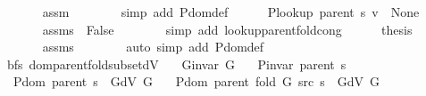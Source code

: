 \begin{isabellebody}
\ \ \ \ \ \ \isamarkupfalse%
\ assm\isanewline
\ \ \ \ \ \ \isamarkupfalse%
\ {\isacharparenleft}{\kern0pt}simp\ add{\isacharcolon}{\kern0pt}\ P{\isachardot}{\kern0pt}dom{\isacharunderscore}{\kern0pt}def{\isacharparenright}{\kern0pt}\isanewline
\ \ \ \ \isamarkupfalse%
\ {\isachardoublequoteopen}P{\isacharunderscore}{\kern0pt}lookup\ {\isacharparenleft}{\kern0pt}parent\ s{\isacharparenright}{\kern0pt}\ v\ {\isasymnoteq}\ None{\isachardoublequoteclose}\isanewline
\ \ \ \ \ \ \isamarkupfalse%
\ assms{\isacharparenleft}{\kern0pt}{}{\isacharcomma}{\kern0pt}\ {}{\isacharparenright}{\kern0pt}\ False\isanewline
\ \ \ \ \ \ \isamarkupfalse%
\ {\isacharparenleft}{\kern0pt}simp\ add{\isacharcolon}{\kern0pt}\ lookup{\isacharunderscore}{\kern0pt}parent{\isacharunderscore}{\kern0pt}fold{\isacharunderscore}{\kern0pt}cong{\isacharparenright}{\kern0pt}\isanewline
\ \ \ \ \isamarkupfalse%
\ {\isacharquery}{\kern0pt}thesis\isanewline
\ \ \ \ \ \ \isamarkupfalse%
\ assms{\isacharparenleft}{\kern0pt}{}{\isacharparenright}{\kern0pt}\isanewline
\ \ \ \ \ \ \isamarkupfalse%
\ {\isacharparenleft}{\kern0pt}auto\ simp\ add{\isacharcolon}{\kern0pt}\ P{\isachardot}{\kern0pt}dom{\isacharunderscore}{\kern0pt}def{\isacharparenright}{\kern0pt}\isanewline
\ \ \isamarkupfalse%
\isanewline
{}\isamarkupfalse%
%
\endisatagproof
{\isafoldproof}%
%
\isadelimproof
\isanewline
%
\endisadelimproof
%
\isadeliminvisible
\isanewline
%
\endisadeliminvisible
%
\isataginvisible
{}\isamarkupfalse%
\ {\isacharparenleft}{\kern0pt}\ bfs{\isacharparenright}{\kern0pt}\ dom{\isacharunderscore}{\kern0pt}parent{\isacharunderscore}{\kern0pt}fold{\isacharunderscore}{\kern0pt}subset{\isacharunderscore}{\kern0pt}dV{\isacharunderscore}{\kern0pt}{}{\isacharcolon}{\kern0pt}\isanewline
\ \ \ {\isachardoublequoteopen}G{\isachardot}{\kern0pt}invar\ G{\isachardoublequoteclose}\isanewline
\ \ \ {\isachardoublequoteopen}P{\isacharunderscore}{\kern0pt}invar\ {\isacharparenleft}{\kern0pt}parent\ s{\isacharparenright}{\kern0pt}{\isachardoublequoteclose}\isanewline
\ \ \ {\isachardoublequoteopen}P{\isachardot}{\kern0pt}dom\ {\isacharparenleft}{\kern0pt}parent\ s{\isacharparenright}{\kern0pt}\ {\isasymsubseteq}\ G{\isachardot}{\kern0pt}dV\ G{\isachardoublequoteclose}\isanewline
\ \ \ {\isachardoublequoteopen}P{\isachardot}{\kern0pt}dom\ {\isacharparenleft}{\kern0pt}parent\ {\isacharparenleft}{\kern0pt}fold\ G\ src\ s{\isacharparenright}{\kern0pt}{\isacharparenright}{\kern0pt}\ {\isasymsubseteq}\ G{\isachardot}{\kern0pt}dV\ G{\isachardoublequoteclose}%

\end{isabellebody}
